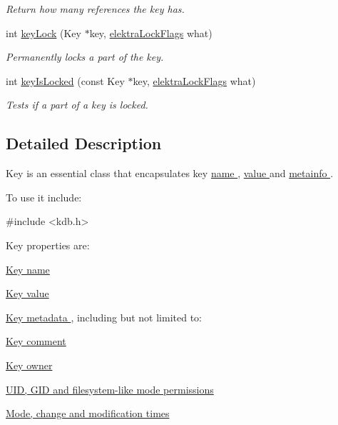 \begin{DoxyCompactItemize}
\begin{DoxyCompactList}\small\item\em Return how many references the key has. \end{DoxyCompactList}\item 
int \hyperlink{group__key_ga5e42b653a0f117be7f1f6eb06c569bb8}{key\+Lock} (Key $\ast$key, \hyperlink{group__key_gafa3306030b1d06b06c3cba24c516f5ec}{elektra\+Lock\+Flags} what)
\begin{DoxyCompactList}\small\item\em Permanently locks a part of the key. \end{DoxyCompactList}\item 
int \hyperlink{group__key_ga769882e86e34a95cefcf8f260ef97e06}{key\+Is\+Locked} (const Key $\ast$key, \hyperlink{group__key_gafa3306030b1d06b06c3cba24c516f5ec}{elektra\+Lock\+Flags} what)
\begin{DoxyCompactList}\small\item\em Tests if a part of a key is locked. \end{DoxyCompactList}\end{DoxyCompactItemize}


\subsection{Detailed Description}
Key is an essential class that encapsulates key \hyperlink{group__keyname}{name }, \hyperlink{group__keyvalue}{value } and \hyperlink{group__keymeta}{metainfo }. 

To use it include\+: 
\begin{DoxyCode}
\textcolor{preprocessor}{#include <kdb.h>}
\end{DoxyCode}


Key properties are\+:
\begin{DoxyItemize}
\item \hyperlink{group__keyname}{Key name }
\item \hyperlink{group__keyvalue}{Key value }
\item \hyperlink{group__keymeta}{Key metadata }, including but not limited to\+:
\begin{DoxyItemize}
\item \hyperlink{group__meta_gafb89735689929ff717cc9f2d0d0b46a2}{Key comment }
\item \hyperlink{}{Key owner }
\item \hyperlink{group__keymeta}{U\+ID, G\+ID and filesystem-\/like mode permissions }
\item \hyperlink{group__keymeta}{Mode, change and modification times }
\end{DoxyItemize}
\end{DoxyItemize}

